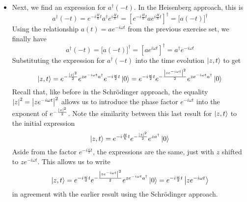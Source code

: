 \documentclass[11pt, a4paper]{article}
\newcommand{\schro}{Schr\"{o}dinger\xspace}
\newcommand{\tev}{e^{-i\frac{H}{\hbar}t}}  %
\newcommand{\tevp}{e^{i\frac{H}{\hbar}t}}  %
\begin{document}
\begin{itemize}
	\item Next, we find an expression for $ a^{\dagger}(-t) $. In the Heisenberg approach, this is
	\begin{equation*}
		a^{\dagger}(-t) = \tev a^{\dagger} \tevp = \left[\tev a \tevp\right]^{\dagger} = \big[a(-t)\big]^{\dagger}
	\end{equation*}
	Using the relationship $ a(t) = ae^{-i\omega t} $ from the previous exercise set, we finally have
	\begin{equation*}
		a^{\dagger}(-t) = \big[a(-t)\big]^{\dagger} = \left[ae^{i\omega t}\right]^{\dagger} = a^{\dagger}e^{-i\omega t}
	\end{equation*}
	Substituting the expression for $  a^{\dagger}(-t)  $ into the time evolution $ \ket{z, t} $ to get
	\begin{equation*}
		\ket{z, t} = e^{-\frac{\abs{z}^{2}}{2}}  e^{ze^{-i\omega t}a^{\dagger}} e^{-i\frac{\omega}{2}t}\ket{0} =  e^{-i\frac{\omega}{2}t} e^{-\frac{\abs{ze^{-i\omega t}}^{2}}{2}} e^{ze^{-i\omega t}a^{\dagger}}\ket{0}
	\end{equation*}
	Recall that, like before in the \schro approach, the equality $ \abs{z}^{2} = \abs{ze^{-i\omega t}}^{2}$ allows us to introduce the phase factor $ e^{-i\omega t} $ into the exponent of $ e^{-\frac{\abs{z}^{2}}{2}} $. Note the similarity between this last result for $ \ket{z, t} $ to the initial expression 
	\begin{equation*}
		\ket{z, t} = \tev e^{-\frac{\abs{z}^{2}}{2}}e^{za^{\dagger}}\ket{0}
	\end{equation*}
	Aside from the factor $ e^{-i\frac{\omega}{2}t} $, the expressions are the same, just with $ z $ shifted to $ ze^{-i\omega t} $. This allows us to write
	\begin{equation*}
		\ket{z, t} =  e^{-i\frac{\omega}{2}t} e^{-\frac{\abs{ze^{-i\omega t}}^{2}}{2}} e^{ze^{-i\omega t}a^{\dagger}}\ket{0} = e^{-i\frac{\omega}{2}t}\ket{ze^{-i\omega t}}
	\end{equation*}
	in agreement with the earlier result using the \schro approach. 
	

\end{itemize}
\end{document}
